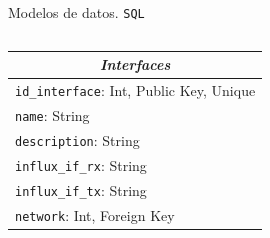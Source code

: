 \documentclass[aspectratio=169,xcolor=dvipsnames]{beamer}
\begin{document}
\begin{frame}{Modelos de datos. \texttt{SQL}}
\begin{columns}
			\begin{column}{0.5\textwidth}
				\begin{table}[h!]
					\centering
					\begin{tabular}{|l|}
						\hline
						\multicolumn{1}{|c|}{\textit{\textbf{Interfaces}}} \\ \hline
						\texttt{id\_interface}: Int, Public Key, Unique             \\ \hline
						\texttt{name}: String                                       \\ \hline
						\texttt{description}: String                                \\ \hline
						\texttt{influx\_if\_rx}: String                             \\ \hline
						\texttt{influx\_if\_tx}: String                             \\ \hline
						\texttt{network}: Int, Foreign Key                          \\ \hline
					\end{tabular}
				\end{table}
			\end{column}
		\end{columns}
	\end{frame}
\end{document}
